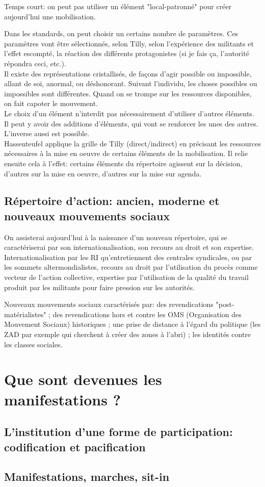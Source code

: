 \documentclass[10pt, a4paper, openany]{book}
\begin{document}
Temps court: on peut pas utiliser un élément "local-patronné" pour créer aujourd'hui une mobilisation. 


Dans les standards, on peut choisir un certains nombre de paramètres. Ces paramètres vont être sélectionnés, selon Tilly, selon l'expérience des militants et l'effet escompté, la réaction des différents protagonistes (si je fais ça, l'autorité répondra ceci, etc.). \\
Il existe des représentations cristallisés, de façons d'agir possible ou impossible, allant de soi, anormal, ou déshonorant. Suivant l'individu, les choses possibles ou impossibles sont différentes. Quand on se trompe sur les ressources disponibles, on fait capoter le mouvement. \\
Le choix d'un élément n'interdit pas nécessairement d'utiliser d'autres éléments. Il peut y avoir des additions d'éléments, qui vont se renforcer les unes des autres. L'inverse aussi est possible. \\
Hassenteufel applique la grille de Tilly (direct/indirect) en précisant les ressources nécessaires à la mise en oeuvre de certains éléments de la mobilisation. Il relie ensuite cela à l'effet: certains éléments du répertoire agissent sur la décision, d'autres sur la mise en oeuvre, d'autres sur la mise sur agenda. 

\section{Répertoire d'action: ancien, moderne et nouveaux mouvements sociaux}

On assisterai aujourd'hui à la naissance d'un nouveau répertoire, qui se caractériserai par son internationalisation, son recours au droit et son expertise. Internationalisation par les RI qu'entretiennent des centrales syndicales, ou par les sommets altermondialistes, recours au droit par l'utilisation du procès comme vecteur de l'action collective, expertise par l'utilisation de la qualité du travail produit par les militants pour faire pression sur les autorités.


Nouveaux mouvements sociaux caractérisés par: des revendications "post-matérialistes" ; des revendications hors et contre les OMS (Organisation des Mouvement Sociaux) historiques ; une prise de distance à l'égard du politique (les ZAD par exemple qui cherchent à créer des zones à l'abri) ; les identités contre les classes sociales. 

\chapter{Que sont devenues les manifestations ?}

\section{L'institution d'une forme de participation: codification et pacification}













\section{Manifestations, marches, sit-in}
\end{document}
